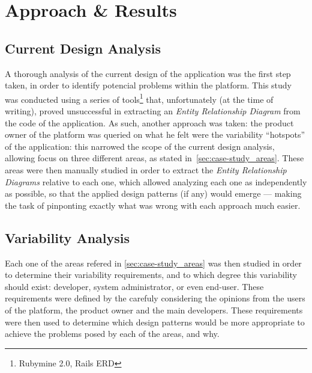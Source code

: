 \chapter{Approach \& Results}\label{chap:approach_results}



\section{Current Design Analysis}\label{sec:current_design_analysis}

A thorough analysis of the current design of the application was the first step taken, in order to identify potencial problems within the platform. This study was conducted using a series of tools\footnote{Rubymine 2.0\cite{rubymine}, Rails ERD\cite{rails_erd}} that, unfortunately (at the time of writing), proved unsuccessful in extracting an \emph{Entity Relationship Diagram} from the code of the application. As such, another approach was taken: the product owner of the platform was queried on what he felt were the variability ``hotspots'' of the application: this narrowed the scope of the current design analysis, allowing focus on three different areas, as stated in~\ref{sec:case-study_areas}. These areas were then manually studied in order to extract the \emph{Entity Relationship Diagrams} relative to each one, which allowed analyzing each one as independently as possible, so that the applied design patterns (if any) would emerge --- making the task of pinponting exactly what was wrong with each approach much easier.

\section{Variability Analysis}\label{sec:variability_analysis}

Each one of the areas refered in \ref{sec:case-study_areas} was then studied in order to determine their variability requirements, and to which degree this variability should exist: developer, system administrator, or even end-user. These requirements were defined by the carefuly considering the opinions from the users of the platform, the product owner and the main developers. These requirements were then used to determine which design patterns would be more appropriate to achieve the problems posed by each of the areas, and why.
